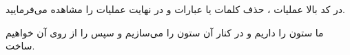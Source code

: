 \begin{boxE}
 \lr{
 
 }   
\end{boxE}

\begin{boxM}
    در کد بالا عملیات 
    ،
    حذف کلمات یا عبارات
    و در نهایت عملیات
    را مشاهده می‌فرمایید.

    ما ستون 
    را داریم و در کنار آن ستون را می‌سازیم و سپس 
    را از روی آن خواهیم ساخت.
\end{boxM}

\begin{boxE}
 \lr{
 
 }   
\end{boxE}


